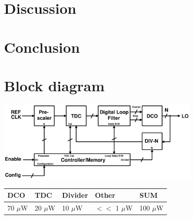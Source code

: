 \documentclass[10pt,a4paper]{article}
\begin{document}
    \section{Discussion}

    \FloatBarrier
    \section{Conclusion}
    \lipsum[1]


	\section{Block diagram}
		\center\includegraphics[width=0.75\textwidth, angle=0]{figs/pll2.pdf}
		\vspace{-.1em}
		\begin{table}[htb!]
			\tiny
			\centering
			\def\arraystretch{1.5}		
			\setlength\arrayrulewidth{0.75pt}
			\setlength{\tabcolsep}{1em} %
			\begin{tabular}{|l|l|l|l|l|}
				\hline 
				\rule[-1ex]{0pt}{2.5ex} \cellcolor{gray!40}\textbf{DCO} & \cellcolor{gray!40}\textbf{TDC} & \cellcolor{gray!40}\textbf{Divider }& \cellcolor{gray!40}\textbf{Other} & \cellcolor{gray!40}\textbf{SUM} \\ 
				\hline 
				\rule[-1ex]{0pt}{2.5ex} 70 $\mu$W& 20 $\mu$W & 10 $\mu$W & $<<$ 1 $\mu$W & 100 $\mu$W\\ 
				\hline 
			\end{tabular} 
		\end{table}   
\end{document}
